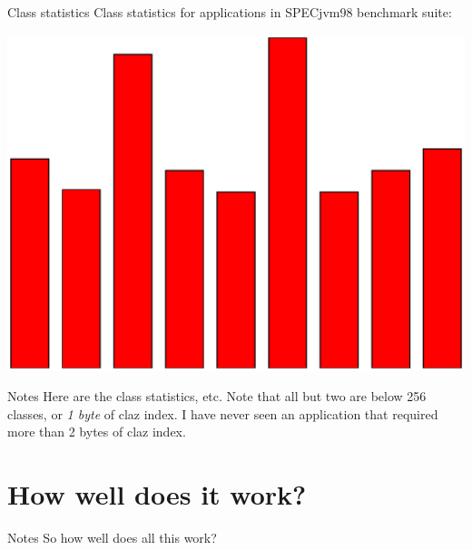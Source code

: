 \documentclass[%
pdf,
colorBG,
slideColor,
nototal,
oqe
]{prosper}
\newenvironment{talknotes}{\begin{slide}{Notes}\tiny}{\end{slide}}
\begin{document}
\begin{slide}{Class statistics}
Class statistics for applications in SPECjvm98 benchmark suite:
\begin{center}
\includegraphics[scale=0.5]{Figures/specclaz.eps}
\end{center}
\end{slide}

\begin{talknotes}
Here are the class statistics, etc.
Note that all but two are below 256 classes, or \emph{1 byte} of claz
index.  I have never seen an application that required more than
2 bytes of claz index.
\end{talknotes}

\part{How well does it work?}

\begin{talknotes}
So how well does all this work?
\end{talknotes}
\end{document}
